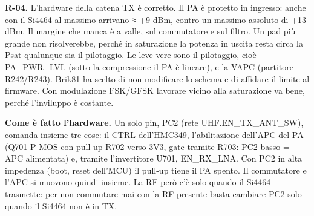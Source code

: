 \textbf{R-04.} L'hardware della catena TX è corretto. Il PA è protetto in ingresso: anche con il Si4464 al massimo arrivano ≈ +9 dBm, contro un massimo assoluto di +13 dBm. Il margine che manca è a valle, sul commutatore e sul filtro. Un pad più grande non risolverebbe, perché in saturazione la potenza in uscita resta circa la Psat qualunque sia il pilotaggio. Le leve vere sono il pilotaggio, cioè PA\_\allowbreak{}PWR\_\allowbreak{}LVL (sotto la compressione il PA è lineare), e la VAPC (partitore R242/\allowbreak{}R243). Brik81 ha scelto di non modificare lo schema e di affidare il limite al firmware. Con modulazione FSK/\allowbreak{}GFSK lavorare vicino alla saturazione va bene, perché l'inviluppo è costante.

\textbf{Come è fatto l'hardware.} Un solo pin, PC2 (rete UHF.EN\_\allowbreak{}TX\_\allowbreak{}ANT\_\allowbreak{}SW), comanda insieme tre cose: il CTRL dell'HMC349, l'abilitazione dell'APC del PA (Q701 P-MOS con pull-up R702 verso 3V3, gate tramite R703: PC2 basso = APC alimentata) e, tramite l'invertitore U701, EN\_\allowbreak{}RX\_\allowbreak{}LNA. Con PC2 in alta impedenza (boot, reset dell'MCU) il pull-up tiene il PA spento. Il commutatore e l'APC si muovono quindi insieme. La RF però c'è solo quando il Si4464 trasmette: per non commutare mai con la RF presente basta cambiare PC2 solo quando il Si4464 non è in TX.

